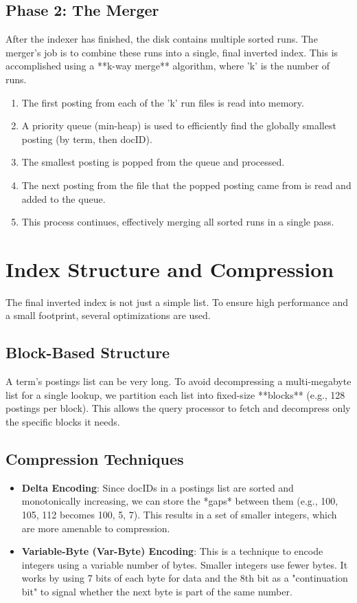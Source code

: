 \documentclass[11pt, a4paper]{report}
\begin{document}
\subsection{Phase 2: The Merger}
After the indexer has finished, the disk contains multiple sorted runs. The merger's job is to combine these runs into a single, final inverted index. This is accomplished using a **k-way merge** algorithm, where 'k' is the number of runs.
\begin{enumerate}
    \item The first posting from each of the 'k' run files is read into memory.
    \item A priority queue (min-heap) is used to efficiently find the globally smallest posting (by term, then docID).
    \item The smallest posting is popped from the queue and processed.
    \item The next posting from the file that the popped posting came from is read and added to the queue.
    \item This process continues, effectively merging all sorted runs in a single pass.
\end{enumerate}

\section{Index Structure and Compression}
The final inverted index is not just a simple list. To ensure high performance and a small footprint, several optimizations are used.

\subsection{Block-Based Structure}
A term's postings list can be very long. To avoid decompressing a multi-megabyte list for a single lookup, we partition each list into fixed-size **blocks** (e.g., 128 postings per block). This allows the query processor to fetch and decompress only the specific blocks it needs.

\subsection{Compression Techniques}
\begin{itemize}
    \item \textbf{Delta Encoding}: Since docIDs in a postings list are sorted and monotonically increasing, we can store the *gaps* between them (e.g., 100, 105, 112 becomes 100, 5, 7). This results in a set of smaller integers, which are more amenable to compression.
    \item \textbf{Variable-Byte (Var-Byte) Encoding}: This is a technique to encode integers using a variable number of bytes. Smaller integers use fewer bytes. It works by using 7 bits of each byte for data and the 8th bit as a "continuation bit" to signal whether the next byte is part of the same number.
\end{itemize}
\end{document}
